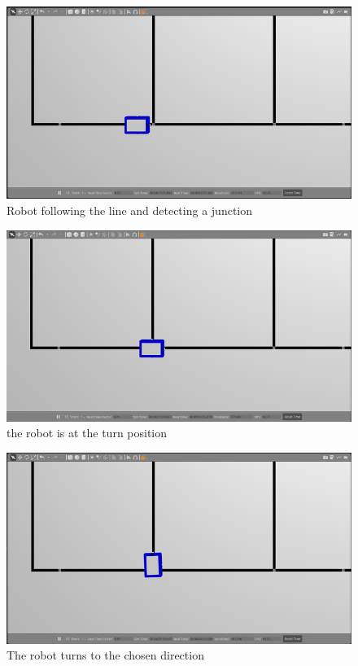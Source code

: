 \documentclass[a4paper,12pt]{extreport}
\begin{document}
\begin{figure}[h!]
  \centering
  \includegraphics[width=\textwidth]{img/image045.png}
  \caption{Robot following the line and detecting a junction}
  \label{judeFig32}
  \end{figure}
\newpage
  \begin{figure}[h!]
    \centering
    \includegraphics[width=\textwidth]{img/image047.png}
    \caption{the robot is at the turn position}
    \end{figure}

    \begin{figure}[h!]
      \centering
      \includegraphics[width=\textwidth]{img/image049.png}
      \caption{The robot turns to the chosen direction}
      \end{figure}
\end{document}
